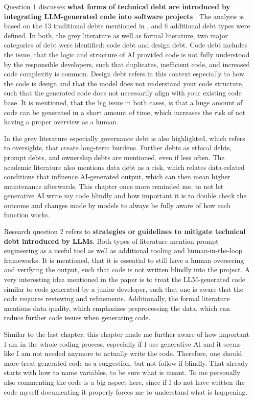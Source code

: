 \documentclass[11pt]{article}
\begin{document}
Question 1 discusses \textbf{what forms of technical debt are introduced by integrating LLM-generated code into software projects} \citep{Ehsani2026Faster}. The analysis is based on 
the 13 traditional debts mentioned in \citep{Alves2014Towards}, and 6 additional debt types were defined.
In both, the grey literature as well as formal literature, two major categories of debt were identified: code debt and design debt. 
Code debt includes the issue, that the logic and structure of AI provided code is not fully understood by the responsible developers, such that duplicates, inefficient code, and increased code complexity is common. 
Design debt refers in this context especially to how the code is design and that the model does not understand your code structure, such that the generated code does not necessarily align with your existing code base. It is mentioned, that the big issue in both cases, is that a huge amount of code can be generated in a short amount of time, which increases the risk of not having a proper overview as a human.

In the grey literature especially governance debt is also highlighted, which refers to oversights, that create long-term burdens. Further debts as ethical debts, prompt debts, and ownership debts are mentioned, even if less often.
The academic literature also mentions data debt as a risk, which relates data-related conditions that influence AI-generated output, which can then mean higher maintenance afterwards. 
This chapter once more reminded me, to not let generative AI write my code blindly and how important it is to double check the outcome and changes made by models to always be fully aware of how each function works. 

Research question 2 refers to \textbf{strategies or guidelines to mitigate technical debt introduced by LLMs}. Both types of literature mention prompt engineering as a useful tool as well as additional tooling and human-in-the-loop frameworks. It is mentioned, that it is essential to still have a human overseeing and verifying the output, such that code is not written blindly into the project. A very interesting idea mentioned in the paper is to treat the LLM-generated code similar to code generated by a junior developer, such that one is aware that the code requires reviewing and refinements. Additionally, the formal literature mentions data quality, which emphasizes preprocessing the data, which can reduce further code issues when generating code.

Similar to the last chapter, this chapter made me further aware of how important I am in the whole coding process, especially if I use generative AI and it seems like I am not needed anymore to actually write the code. Therefore, one should more treat generated code as a suggestion, but not follow if blindly. That already starts with how to name variables, to be sure what is meant. To me personally also commenting the code is a big aspect here, since if I do not have written the code myself documenting it properly forces me to understand what is happening. 
\end{document}

